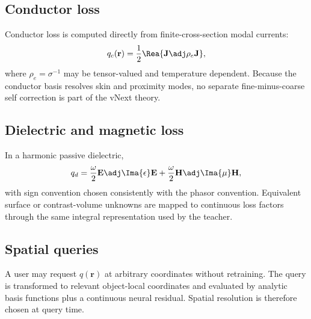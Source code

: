 \subsection{Conductor loss}

Conductor loss is computed directly from finite-cross-section modal currents:
\[
  q_c(\mathbf r)
  =\frac12 \Rea\{\mathbf J\adj\rho_e\mathbf J\},
\]
where $\rho_e=\sigma^{-1}$ may be tensor-valued and temperature dependent.
Because the conductor basis resolves skin and proximity modes, no separate
fine-minus-coarse self correction is part of the vNext theory.

\subsection{Dielectric and magnetic loss}

In a harmonic passive dielectric,
\[
  q_d
  =
  \frac{\omega}{2}
  \mathbf E\adj \Ima\{\epsilon\}\mathbf E
  +\frac{\omega}{2}
  \mathbf H\adj \Ima\{\mu\}\mathbf H ,
\]
with sign convention chosen consistently with the phasor convention. Equivalent
surface or contrast-volume unknowns are mapped to continuous loss factors
through the same integral representation used by the teacher.

\subsection{Spatial queries}

A user may request $q(\mathbf r)$ at arbitrary coordinates without retraining.
The query is transformed to relevant object-local coordinates and evaluated by
analytic basis functions plus a continuous neural residual. Spatial resolution
is therefore chosen at query time.
